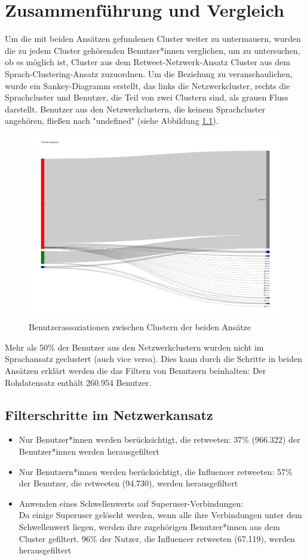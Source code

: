 \chapter{Zusammenführung und Vergleich}
\label{chap:vergleich}
Um die mit beiden Ansätzen gefundenen Cluster weiter zu untermauern, wurden die zu jedem Cluster gehörenden Benutzer*innen verglichen, um zu untersuchen, ob es möglich ist, Cluster aus dem Retweet-Netzwerk-Ansatz Cluster aus dem Sprach-Clustering-Ansatz zuzuordnen.
Um die Beziehung zu veranschaulichen, wurde ein Sankey-Diagramm erstellt, das links die Netzwerkcluster, rechts die Sprachcluster und Benutzer, die Teil von zwei Clustern sind, als grauen Fluss darstellt. Benutzer aus den Netzwerkclustern, die keinem Sprachcluster angehören, fließen nach "undefined" (siehe Abbildung \ref{fig:vergleichundefined}).
\begin{figure}[h!]
	\centering
	\includegraphics[width=0.7\linewidth]{images/VergleichUndefined}
	\caption{Benutzerassoziationen zwischen Clustern der beiden Ansätze}
	\label{fig:vergleichundefined}
\end{figure}
Mehr als 50\% der Benutzer aus den Netzwerkclustern wurden nicht im Sprachansatz geclustert (auch vice versa).
Dies kann durch die Schritte in beiden Ansätzen erklärt werden die das Filtern von Benutzern beinhalten:
Der Rohdatensatz enthält 260.954 Benutzer.
\section{Filterschritte im Netzwerkansatz}
\begin{itemize}
	\item Nur Benutzer*innen werden berücksichtigt, die retweeten: 37\% (966.322) der Benutzer*innen werden herausgefiltert
	\item Nur Benutzern*innen werden berücksichtigt, die Influencer retweeten: 57\% der Benutzer, die retweeten (94.730), werden herausgefiltert
	\item Anwenden eines Schwellenwerts auf Superuser-Verbindungen:\\
	Da einige Superuser gelöscht werden, wenn alle ihre Verbindungen unter dem Schwellenwert liegen, werden ihre zugehörigen Benutzer*innen aus dem Cluster gefiltert. 96\% der Nutzer, die Influencer retweeten (67.119), werden herausgefiltert
\end{itemize}
